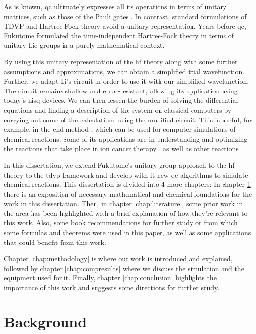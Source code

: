 \documentclass{aux/ttuthes2007}
\begin{document}
As is known, \gls{qc} ultimately expresses all its operations in terms of unitary matrices, such as those of the Pauli gates .
In contrast, standard formulations of TDVP and Hartree-Fock theory  avoid a unitary representation.
Years before \gls{qc}, Fukutome  formulated the time-independent Hartree-Fock theory in terms of unitary Lie groups  in a purely mathematical context.

By using this unitary representation of the \gls{hf} theory along with some further assumptions and approximations, we can obtain a simplified trial wavefunction.
Further, we adapt Li's circuit  in order to use it with our simplified wavefunction. The circuit remains shallow and error-resistant, allowing its application using today's \gls{nisq} devices.
We can then lessen the burden of solving the differential equations and finding a description of the system on classical computers by carrying out some of the calculations using the modified circuit.
This is useful, for example, in the \gls{end} method , which can be used for computer simulations of chemical reactions.
Some of its applications are in understanding and optimizing the reactions that take place in ion cancer therapy , as well as other reactions .

In this dissertation, we extend Fukutome’s unitary group approach to the \gls{hf} theory to the \gls{tdvp} framework and develop with it new \gls{qc} algorithms to simulate chemical reactions.
This dissertation is divided into 4 more chapters: In chapter \ref{chap:background} there is an exposition of necessary mathematical and chemical foundations for the work in this dissertation.
Then, in chapter \ref{chap:literature}, some prior work in the area has been highlighted with a brief explanation of how they're relevant to this work.
Also, some book recommendations for further study or from which some formulas and theorems were used in this paper, as well as some applications that could benefit from this work.

Chapter \ref{chap:methodology} is where our work is introduced and explained, followed by chapter \ref{chap:compresults} where we discuss the simulation and the equipment used for it. 
Finally, chapter \ref{chap:conclusion} highlights the importance of this work and suggests some directions for further study.

\chapter{\textbf{Background}}\label{chap:background}
\end{document}
